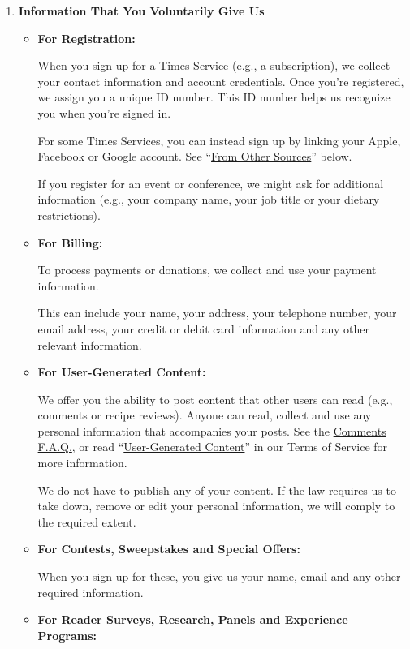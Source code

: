 \begin{enumerate}
\def\labelenumi{\arabic{enumi}.}
\tightlist
\item
  \textbf{Information That You Voluntarily Give Us}

  \begin{itemize}
  \item
    \textbf{For Registration:}

    When you sign up for a Times Service (e.g., a subscription), we
    collect your contact information and account credentials. Once
    you're registered, we assign you a unique ID number. This ID number
    helps us recognize you when you're signed in.

    For some Times Services, you can instead sign up by linking your
    Apple, Facebook or Google account. See
    ``\protect\hyperlink{anchor-question1-sectionB}{From Other
    Sources}'' below.

    If you register for an event or conference, we might ask for
    additional information (e.g., your company name, your job title or
    your dietary restrictions).
  \item
    \textbf{For Billing:}

    To process payments or donations, we collect and use your payment
    information.

    This can include your name, your address, your telephone number,
    your email address, your credit or debit card information and any
    other relevant information.
  \item
    \textbf{For User-Generated Content:}

    We offer you the ability to post content that other users can read
    (e.g., comments or recipe reviews). Anyone can read, collect and use
    any personal information that accompanies your posts. See the
    \href{https://help.nytimes3xbfgragh.onion/hc/en-us/articles/115014792387-Comments}{Comments
    F.A.Q.}, or read
    ``\href{https://help.nytimes3xbfgragh.onion/hc/en-us/articles/115014893428-Terms-of-service\#3}{User-Generated
    Content}'' in our Terms of Service for more information.

    We do not have to publish any of your content. If the law requires
    us to take down, remove or edit your personal information, we will
    comply to the required extent.
  \item
    \textbf{For Contests, Sweepstakes and Special Offers:}

    When you sign up for these, you give us your name, email and any
    other required information.
  \item
    \textbf{For Reader Surveys, Research, Panels and Experience
    Programs:}


\end{itemize}
\end{enumerate}
